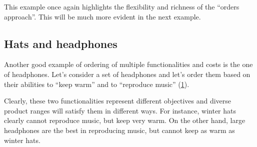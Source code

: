This example once again highlights the flexibility and richness of the ``orders approach''.
This will be much more evident in the next example.



\subsection{Hats and headphones}
Another good example of ordering of multiple functionalities and costs is the one of headphones.
Let's consider a set of headphones and let's order them based on their abilities to ``keep warm'' and to ``reproduce music'' (\cref{fig:headpho_fun}).

\begin{figure}[h!]
  \begin{center}
\end{center}
  \caption{\label{fig:headpho_fun}}
\end{figure}

Clearly, these two functionalities represent different objectives and diverse product ranges will satisfy them in different ways.
For instance, winter hats clearly cannot reproduce music, but keep very warm.
On the other hand, large headphones are the best in reproducing music, but cannot keep as warm as winter hats.



\begin{figure}[h!]
  \begin{center}
\end{center}
  \caption{\label{fig:headpho_price}}
\end{figure}

\begin{figure}[h!]
  \begin{center}
\end{center}
  \caption{\label{fig:headpho_charge}}
\end{figure}

\begin{figure}[h!]
  \begin{center}
\end{center}
  \caption{\label{fig:headpho_wires}}
\end{figure}

\devel{} %
